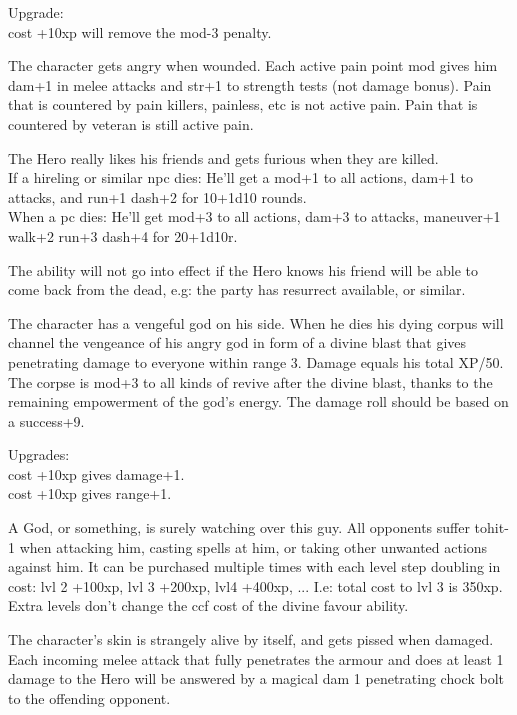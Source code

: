 Upgrade: \\
cost +10xp will remove the mod-3 penalty.


 The character gets angry when wounded. Each active pain point mod gives him dam+1 in melee attacks and str+1 to strength tests (not damage bonus). Pain that is countered by pain killers, painless, etc is not active pain. Pain that is countered by veteran is still active pain.


 The Hero really likes his friends and gets furious when they are killed.\\
If a hireling or similar npc dies: He'll get a mod+1 to all actions, dam+1 to attacks, and run+1 dash+2 for 10+1d10 rounds.\\
When a pc dies: He'll get mod+3 to all actions, dam+3 to attacks, maneuver+1 walk+2 run+3 dash+4 for 20+1d10r.

The ability will not go into effect if the Hero knows his friend will be able to come back from the dead, e.g: the party has resurrect available, or similar.


 The character has a vengeful god on his side. When he dies his dying corpus will channel the vengeance of his angry god in form of a divine blast that gives penetrating damage to everyone within range 3. Damage equals his total XP/50. The corpse is mod+3 to all kinds of revive after the divine blast, thanks to the remaining empowerment of the god's energy. The damage roll should be based on a success+9.

Upgrades: \\
cost +10xp gives damage+1. \\
cost +10xp gives range+1.


 A God, or something, is surely watching over this guy. All opponents suffer tohit-1 when attacking him, casting spells at him, or taking other unwanted actions against him. It can be purchased multiple times with each level step doubling in cost: lvl 2 +100xp, lvl 3 +200xp, lvl4 +400xp, ... I.e: total cost to lvl 3 is 350xp. Extra levels don't change the ccf cost of the divine favour ability.


 The character's skin is strangely alive by itself, and gets pissed when damaged. Each incoming melee attack that fully penetrates the armour and does at least 1 damage to the Hero will be answered by a magical dam 1 penetrating chock bolt to the offending opponent.

